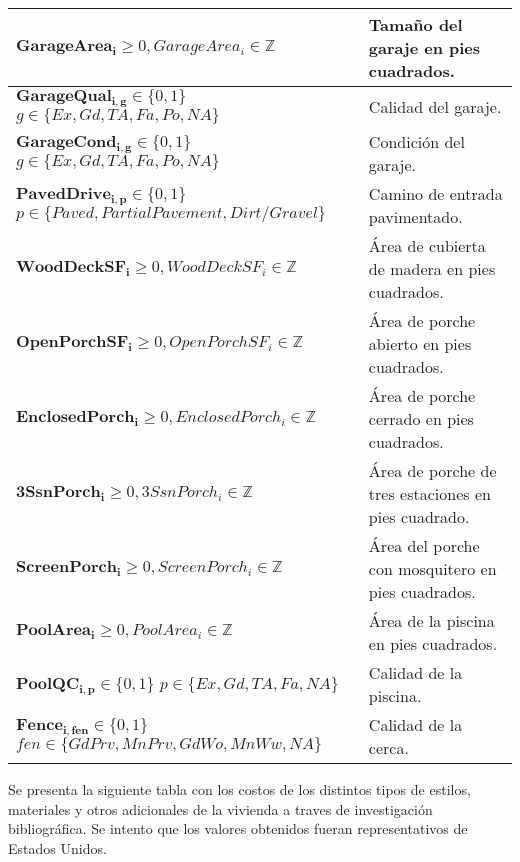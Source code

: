 \begin{longtable}{ | p{8cm} | p{5cm} | }
    \hline
    $\boldsymbol{GarageArea_{i}} \geq 0, GarageArea_{i} \in \mathbb{Z}$ & Tamaño del garaje en pies cuadrados.\\
    \hline
    $\boldsymbol{GarageQual_{i,g}} \in \{0, 1\}$\newline 
    $g \in \{Ex, Gd, TA, Fa, Po, NA\}$ & Calidad del garaje.\\
    \hline
    $\boldsymbol{GarageCond_{i,g}} \in \{0, 1\}$\newline 
    $g \in \{Ex, Gd, TA, Fa, Po, NA\}$ & Condición del garaje.\\
    \hline
    $\boldsymbol{PavedDrive_{i,p}} \in \{0, 1\}$\newline 
    $p \in \{Paved, Partial Pavement, Dirt/Gravel\}$ & Camino de entrada pavimentado.\\
    \hline
    $\boldsymbol{WoodDeckSF_{i}} \geq 0, WoodDeckSF_{i} \in \mathbb{Z}$ & Área de cubierta de madera en pies cuadrados.\\
    \hline
    $\boldsymbol{OpenPorchSF_{i}} \geq 0, OpenPorchSF_{i} \in \mathbb{Z}$ & Área de porche abierto en pies cuadrados.\\
    \hline
    $\boldsymbol{EnclosedPorch_{i}} \geq 0, EnclosedPorch_{i} \in \mathbb{Z}$ & Área de porche cerrado en pies cuadrados.\\
    \hline
    $\boldsymbol{3SsnPorch_{i}} \geq 0, 3SsnPorch_{i} \in \mathbb{Z}$ & Área de porche de tres estaciones en pies cuadrado.\\
    \hline
    $\boldsymbol{ScreenPorch_{i}} \geq 0, ScreenPorch_{i} \in \mathbb{Z}$ & Área del porche con mosquitero en pies cuadrados.\\
    \hline    
    $\boldsymbol{PoolArea_{i}} \geq 0, PoolArea_{i} \in \mathbb{Z}$ & Área de la piscina en pies cuadrados.\\
    \hline    
    $\boldsymbol{PoolQC_{i,p}} \in \{0, 1\}$\newline 
    $p \in \{Ex, Gd, TA, Fa, NA\}$ &Calidad de la piscina.\\
    \hline
    $\boldsymbol{Fence_{i,fen}} \in \{0, 1\}$\newline 
    $fen \in \{GdPrv,MnPrv,GdWo,MnWw, NA\}$ &Calidad de la cerca.\\
    \hline
\end{longtable}









Se presenta la siguiente tabla con los costos de los distintos tipos de estilos, materiales y otros adicionales de la vivienda a traves de investigación bibliográfica. Se intento que los valores obtenidos fueran representativos de Estados Unidos. 

